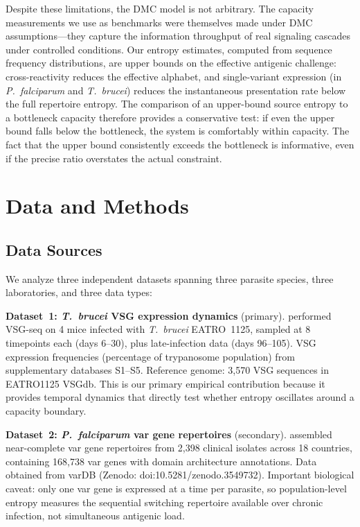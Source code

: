 \documentclass[twocolumn,10pt]{article}
\begin{document}
Despite these limitations, the DMC model is not arbitrary.  The capacity measurements we use as benchmarks were themselves made under DMC assumptions---they capture the information throughput of real signaling cascades under controlled conditions.  Our entropy estimates, computed from sequence frequency distributions, are upper bounds on the effective antigenic challenge: cross-reactivity reduces the effective alphabet, and single-variant expression (in \textit{P.~falciparum} and \textit{T.~brucei}) reduces the instantaneous presentation rate below the full repertoire entropy.  The comparison of an upper-bound source entropy to a bottleneck capacity therefore provides a conservative test: if even the upper bound falls below the bottleneck, the system is comfortably within capacity.  The fact that the upper bound consistently exceeds the bottleneck is informative, even if the precise ratio overstates the actual constraint.

\section{Data and Methods}
\label{sec:data}

\subsection{Data Sources}

We analyze three independent datasets spanning three parasite species, three laboratories, and three data types:

\textbf{Dataset~1: \textit{T.~brucei} VSG expression dynamics} (primary).  \citet{mugnier2015} performed VSG-seq on 4 mice infected with \textit{T.~brucei} EATRO~1125, sampled at 8 timepoints each (days 6--30), plus late-infection data (days 96--105).  VSG expression frequencies (percentage of trypanosome population) from supplementary databases S1--S5.  Reference genome: 3,570 VSG sequences in EATRO1125 VSGdb.  This is our primary empirical contribution because it provides temporal dynamics that directly test whether entropy oscillates around a capacity boundary.

\textbf{Dataset~2: \textit{P.~falciparum} var gene repertoires} (secondary).  \citet{otto2019} assembled near-complete var gene repertoires from 2,398 clinical isolates across 18 countries, containing 168,738 var genes with domain architecture annotations.  Data obtained from varDB (Zenodo: doi:10.5281/zenodo.3549732).  Important biological caveat: only one var gene is expressed at a time per parasite, so population-level entropy measures the sequential switching repertoire available over chronic infection, not simultaneous antigenic load.
\end{document}

